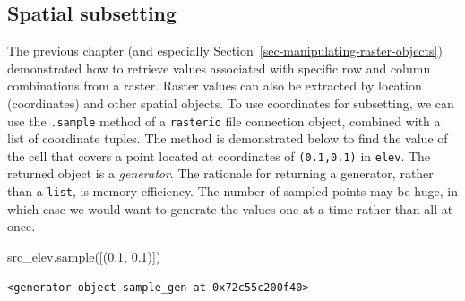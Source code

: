 \documentclass[
  letterpaper,
]{krantz}
\newenvironment{Shaded}{\begin{snugshade}}{\end{snugshade}}
\newcommand{\FloatTok}[1]{\textcolor[rgb]{0.68,0.00,0.00}{#1}}
\newcommand{\NormalTok}[1]{\textcolor[rgb]{0.00,0.23,0.31}{#1}}
\begin{document}
\subsection{Spatial subsetting}\label{sec-spatial-subsetting-raster}

The previous chapter (and especially
Section~\ref{sec-manipulating-raster-objects}) demonstrated how to
retrieve values associated with specific row and column combinations
from a raster. Raster values can also be extracted by location
(coordinates) and other spatial objects. To use coordinates for
subsetting, we can use the \texttt{.sample} method of a
\texttt{rasterio} file connection object, combined with a list of
coordinate tuples. The method is demonstrated below to find the value of
the cell that covers a point located at coordinates of
\texttt{(0.1,0.1)} in \texttt{elev}. The returned object is a
\emph{generator}. The rationale for returning a generator, rather than a
\texttt{list}, is memory efficiency. The number of sampled points may be
huge, in which case we would want to generate the values one at a time
rather than all at once.

\begin{Shaded}
\begin{Highlighting}[]
\NormalTok{src\_elev.sample([(}\FloatTok{0.1}\NormalTok{, }\FloatTok{0.1}\NormalTok{)])}
\end{Highlighting}
\end{Shaded}

\begin{verbatim}
<generator object sample_gen at 0x72c55c200f40>
\end{verbatim}
\end{document}
